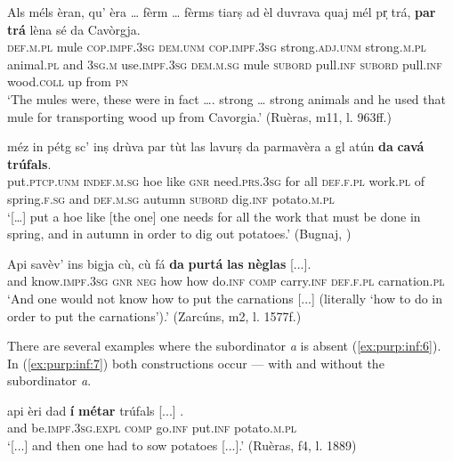 \ea
\label{ex:purp:inf:3}
\gll Als méls èran, qu’ èra … fèrm … fèrms tiarṣ ad èl duvrava quaj mél pr̩ trá, \textbf{par} \textbf{trá} lèna sé da Cavòrgja.\\
\textsc{def.m.pl} mule \textsc{cop.impf.3sg} \textsc{dem.unm} \textsc{cop.impf.3sg} {} strong.\textsc{adj.unm} {} strong.\textsc{m.pl} animal.\textsc{pl} and \textsc{3sg.m} use.\textsc{impf.3sg} \textsc{dem.m.sg} mule \textsc{subord} pull.\textsc{inf} \textsc{subord} pull.\textsc{inf} wood.\textsc{coll} up from \textsc{pn}\\
\glt `The mules were, these were in fact …. strong … strong animals and he used that mule for transporting wood up from Cavorgia.' (Ruèras, m11, l. 963ff.)
\z

\ea
\label{ex:purp:inf:4}
\gll  [...] méz in pétg sc’ inṣ drùva par tùt las lavurṣ da parmavèra a gl atún \textbf{da} \textbf{cavá} \textbf{trúfals}.\\
{} put.\textsc{ptcp.unm} \textsc{indef.m.sg} hoe like \textsc{gnr} need.\textsc{prs.3sg} for all \textsc{def.f.pl} work.\textsc{pl} of spring.\textsc{f.sg} and \textsc{def.m.sg} autumn \textsc{subord} dig.\textsc{inf} potato.\textsc{m.pl}\\
\glt `[…] put a hoe like [the one] one needs for all the work that must be done in spring, and in autumn in order to dig out potatoes.' (Bugnaj, \citealt[143]{Büchli1966})
\z

\ea
\label{ex:purp:inf:5}
\gll    Api savèv’ ins bigja cù, cù fá \textbf{da} \textbf{purtá} \textbf{las} \textbf{nèglas} [...].\\
and know.\textsc{impf.3sg} \textsc{gnr} \textsc{neg} how how do.\textsc{inf} \textsc{comp} carry.\textsc{inf} \textsc{def.f.pl} carnation.\textsc{pl}\\
\glt `And one would not know how to put the carnations [...] (literally `how to do in order to put the carnations').' (Zarcúns, m2, l. 1577f.)
\z

There are several examples where the subordinator \textit{a} is absent (\ref{ex:purp:inf:6}). In (\ref{ex:purp:inf:7}) both constructions occur — with and without the subordinator \textit{a}.

\ea
\label{ex:purp:inf:6}
	\gll [...] api èri dad \textbf{í} \longrule {} \textbf{métar} trúfals [...] .\\
{} and be.\textsc{impf.3sg.expl} \textsc{comp} go.\textsc{inf} {}  put.\textsc{inf} potato.\textsc{m.pl}\\
\glt `[...] and then one had to sow potatoes [...].' (Ruèras, f4, l. 1889)
\z

